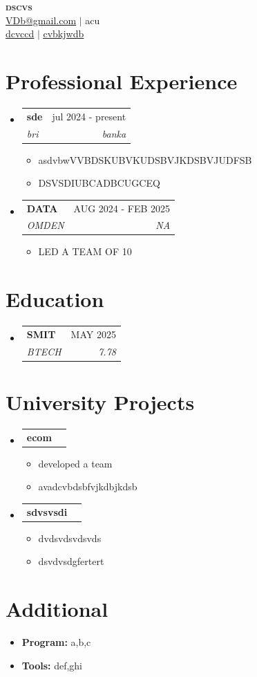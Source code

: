\documentclass[letterpaper,11pt]{article}
\makeatletter
\newcommand{\resumeItem}[1]{
  \item \small{
    {#1 \vspace{-2pt}}
  }
}
\newcommand{\resumeSubheading}[4]{
  \vspace{-2pt}\item
    \begin{tabular*}{0.97\textwidth}[t]{l@{\extracolsep{\fill}}r}
      \textbf{#1} & #2 \\
      \textit{\small#3} & \textit{\small#4} \\
    \end{tabular*}\vspace{-5pt}
}
\newcommand{\resumeProjectHeading}[2]{
    \vspace{-2pt}\item
    \begin{tabular*}{0.97\textwidth}[t]{l@{\extracolsep{\fill}}r}
      \small#1 & #2 \\
    \end{tabular*}\vspace{-5pt}
}
\newcommand{\resumeSubHeadingListStart}{\begin{itemize}[leftmargin=0.15in, label={}]}
\newcommand{\resumeSubHeadingListEnd}{\end{itemize}}
\newcommand{\resumeItemListStart}{\begin{itemize}}
\newcommand{\resumeItemListEnd}{\end{itemize}\vspace{-5pt}}
\makeatother
\begin{document}
\begin{center}
    \textbf{\Huge \scshape dscvs} \\ \vspace{1pt}
     \href{mailto:VDb@gmail.com}{\underline{VDb@gmail.com}} $|$ acu \\
     \href{https://dcvccd}{\underline{dcvccd}} $|$
     \href{https://cvbkjwdb}{\underline{cvbkjwdb}}
\end{center}

\section{Professional Experience}
  \resumeSubHeadingListStart
    \resumeSubheading
      {sde}{jul 2024 - present}
      {bri}{banka}
      \resumeItemListStart
        \resumeItem{asdvbwVVBDSKUBVKUDSBVJKDSBVJUDFSB}
        \resumeItem{DSVSDIUBCADBCUGCEQ}
      \resumeItemListEnd
    \resumeSubheading
      {DATA}{AUG 2024 - FEB 2025}
      {OMDEN}{NA}
      \resumeItemListStart
        \resumeItem{LED A TEAM OF 10}
      \resumeItemListEnd
  \resumeSubHeadingListEnd

\section{Education}
  \resumeSubHeadingListStart
    \resumeSubheading
      {SMIT}{MAY 2025}
      {BTECH}{7.78}
  \resumeSubHeadingListEnd

\section{University Projects}
  \resumeSubHeadingListStart
      \resumeProjectHeading
      {{\textbf{ecom}}}{}
      \resumeItemListStart
        \resumeItem{developed a team}
        \resumeItem{avadcvbdsbfvjkdbjkdsb}
      \resumeItemListEnd
      \resumeProjectHeading
      {{\textbf{sdvsvsdi}}}{}
      \resumeItemListStart
        \resumeItem{dvdsvdsvdsvds}
        \resumeItem{dsvdvsdgfertert}
      \resumeItemListEnd
  \resumeSubHeadingListEnd

\section{Additional}
\begin{itemize}[itemsep=-2pt]
  \item \textbf{Program:} a,b,c
  \item \textbf{Tools:} def,ghi
\end{itemize}
\end{document}

